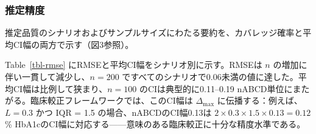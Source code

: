 \documentclass[
  a4paper,
  11pt]{ltjsarticle}
\begin{document}
\subsubsection{推定精度}\label{ux63a8ux5b9aux7cbeux5ea6}

推定品質のシナリオおよびサンプルサイズにわたる要約を、カバレッジ確率と平均CI幅の両方で示す（図3参照）。

Table~\ref{tbl-rmse} にRMSEと平均CI幅をシナリオ別に示す。RMSEは \(n\)
の増加に伴い一貫して減少し、\(n = 200\)
ですべてのシナリオで0.06未満の値に達した。平均CI幅は比例して狭まり、\(n = 100\)
のCIは典型的に0.11--0.19
nABCD単位にまたがる。臨床較正フレームワークでは、このCI幅は
\(\Delta_{\max}\) に伝播する：例えば、\(L = 0.3\) かつ IQR = 1.5
の場合、nABCDのCI幅0.13は
\(2 \times 0.3 \times 1.5 \times 0.13 = 0.12\)\%
HbA1cのCI幅に対応する------意味のある臨床較正に十分な精度水準である。
\end{document}
